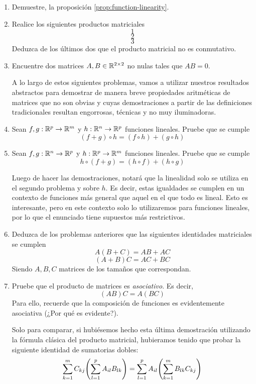 \begin{enumerate}
    \item Demuestre, la proposición \ref{prop:function-linearity}.
    \item Realice los siguientes productos matriciales
        \[1\]
        \[2\]
        \[3\]
        Deduzca de los últimos dos que el producto matricial no es conmutativo.
    \item Encuentre dos matrices $A, B \in \mathbb{R}^{2 \times 2}$ no nulas tales que $AB = 0$.
    
    A lo largo de estos siguientes problemas, vamos a utilizar nuestros resultados abstractos para demostrar de manera breve propiedades aritméticas de matrices que no son obvias y cuyas demostraciones a partir de las definiciones tradicionales resultan engorrosas, técnicas y no muy iluminadoras.
    \item Sean $f, g : \mathbb{R}^p \to \mathbb{R}^m$ y $h: \mathbb{R}^n \to \mathbb{R}^p$ funciones lineales. Pruebe que se cumple
    \[(f + g) \circ h = (f \circ h) + (g \circ h)\]
    \item  Sean $f, g : \mathbb{R}^n \to \mathbb{R}^p$ y $h: \mathbb{R}^p \to \mathbb{R}^m$ funciones lineales. Pruebe que se cumple
    \[h \circ(f + g) = (h \circ f) + (h \circ g)\]

    \begin{remark}
        Luego de hacer las demostraciones, notará que la linealidad solo se utiliza en el segundo problema y sobre $h$. Es decir, estas igualdades se cumplen en un contexto de funciones más general que aquel en el que todo es lineal. Esto es interesante, pero en este contexto solo lo utilizaremos para funciones lineales, por lo que el enunciado tiene supuestos más restrictivos.
    \end{remark}
    \item Deduzca de los problemas anteriores que las siguientes identidades matriciales se cumplen
    \[A(B + C) = AB + AC\]
    \[(A + B)C = AC + BC\]
    Siendo $A, B, C$ matrices de los tamaños que correspondan.

    \item Pruebe que el producto de matrices es \textit{asociativo}. Es decir,
    \[(AB)C = A(BC)\]
    Para ello, recuerde que la composición de funciones es evidentemente asociativa (¿Por qué es evidente?).
    \begin{remark}
        Solo para comparar, si hubiésemos hecho esta última demostración utilizando la fórmula clásica del producto matricial, hubieramos tenido que probar la siguiente identidad de sumatorias dobles:
        \[\sum_{k=1}^m C_{kj}\qty(\sum_{l=1}^p A_{il}B_{lk}) = \sum_{l=1}^p A_{il} \qty(\sum_{k=1}^m B_{lk}C_{kj})\]
    \end{remark}

\end{enumerate}